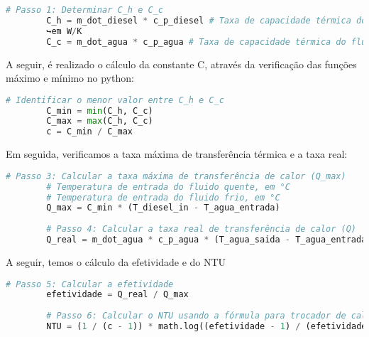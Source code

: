 \begin{center}
	\begin{lstlisting}[language=python]
		# Passo 1: Determinar C_h e C_c
		C_h = m_dot_diesel * c_p_diesel # Taxa de capacidade térmica do fluido quente,␣
		↪em W/K
		C_c = m_dot_agua * c_p_agua # Taxa de capacidade térmica do fluido frio, em W/K
	\end{lstlisting}
\end{center}

A seguir, é realizado o cálculo da constante C, através da verificação das funções máximo e mínimo no python:
\begin{center}
	\begin{lstlisting}[language=python]
		# Identificar o menor valor entre C_h e C_c
		C_min = min(C_h, C_c)
		C_max = max(C_h, C_c)
		c = C_min / C_max
	\end{lstlisting}
\end{center}

Em seguida, verificamos a taxa máxima de transferência térmica e a taxa real:

\begin{center}
	\begin{lstlisting}[language=python]
		# Passo 3: Calcular a taxa máxima de transferência de calor (Q_max)
		# Temperatura de entrada do fluido quente, em °C
		# Temperatura de entrada do fluido frio, em °C
		Q_max = C_min * (T_diesel_in - T_agua_entrada)
		
		# Passo 4: Calcular a taxa real de transferência de calor (Q)
		Q_real = m_dot_agua * c_p_agua * (T_agua_saida - T_agua_entrada)
	\end{lstlisting}
\end{center}

A seguir, temos o cálculo da efetividade e do NTU


\begin{center}
	\begin{lstlisting}[language=python]
		# Passo 5: Calcular a efetividade
		efetividade = Q_real / Q_max
		
		# Passo 6: Calcular o NTU usando a fórmula para trocador de calor contracorrente
		NTU = (1 / (c - 1)) * math.log((efetividade - 1) / (efetividade * c - 1))
	\end{lstlisting}
\end{center}

